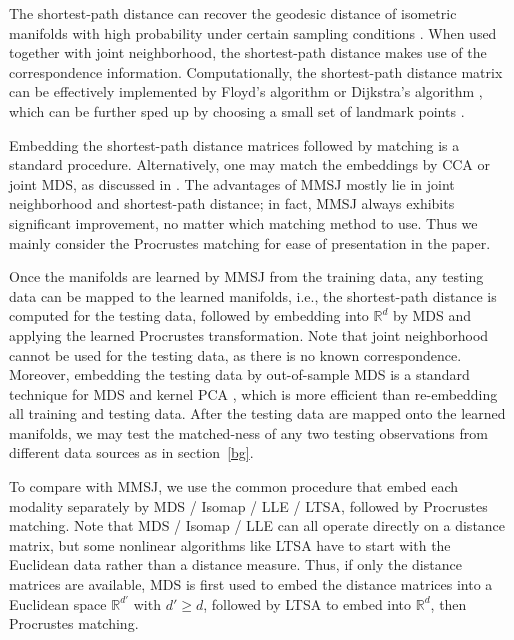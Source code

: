 \documentclass[times,twocolumn,final]{elsarticle}
\begin{document}
The shortest-path distance can recover the geodesic distance of isometric manifolds with high probability under certain sampling conditions \citep{BernsteinEtAl2000, SilvaTenenbaum2003}. When used together with joint neighborhood, the shortest-path distance makes use of the correspondence information. Computationally, the shortest-path distance matrix can be effectively implemented by Floyd's algorithm or Dijkstra's algorithm \citep{TenenbaumSilvaLangford2000}, which can be further sped up by choosing a small set of landmark points \citep{SilvaTenenbaum2003, BengioEtal2003}.  

Embedding the shortest-path distance matrices followed by matching is a standard procedure. Alternatively, one may match the embeddings by CCA or joint MDS, as discussed in \citep{PriebeMarchette2012, FishkindShenPriebe2016}. The advantages of MMSJ mostly lie in joint neighborhood and shortest-path distance; in fact, MMSJ always exhibits significant improvement, no matter which matching method to use. Thus we mainly consider the Procrustes matching for ease of presentation in the paper.

Once the manifolds are learned by MMSJ from the training data, any testing data can be mapped to the learned manifolds, i.e., the shortest-path distance is computed for the testing data, followed by embedding into $\mathbb{R}^{d}$ by MDS and applying the learned Procrustes transformation. Note that joint neighborhood cannot be used for the testing data, as there is no known correspondence. Moreover, embedding the testing data by out-of-sample MDS is a standard technique for MDS and kernel PCA \citep{ScholkopfSmolaMuller1998,BengioEtal2003,TrossetPriebe2008}, which is more efficient than re-embedding all training and testing data. After the testing data are mapped onto the learned manifolds, we may test the matched-ness of any two testing observations from different data sources as in section~\ref{bg}.

To compare with MMSJ, we use the common procedure that embed each modality separately by MDS / Isomap / LLE / LTSA, followed by Procrustes matching. Note that MDS / Isomap / LLE can all operate directly on a distance matrix, but some nonlinear algorithms like LTSA have to start with the Euclidean data rather than a distance measure. Thus, if only the distance matrices are available, MDS is first used to embed the distance matrices into a Euclidean space $\mathbb{R}^{d'}$ with $d' \geq d$, followed by LTSA to embed into $\mathbb{R}^{d}$, then Procrustes matching.
\end{document}
